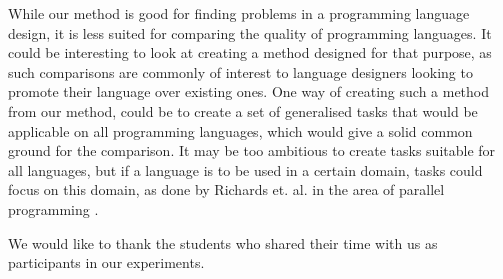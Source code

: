\documentclass[preprint,10pt]{sigplanconf}
\begin{document}
While our method is good for finding problems in a programming language design, it is less suited for comparing the quality of programming languages.
It could be interesting to look at creating a method designed for that purpose, as such comparisons are commonly of interest to language designers looking to promote their language over existing ones.
One way of creating such a method from our method, could be to create a set of generalised tasks that would be applicable on all programming languages, which would give a solid common ground for the comparison. It may be too ambitious to create tasks suitable for all languages, but if a language is to be used in a certain domain, tasks could focus on this domain, as done by Richards et. al. in the area of parallel programming \cite{richards2014productivity}.



%

\acks
We would like to thank the students who shared their time with us as participants in our experiments.




\end{document}
